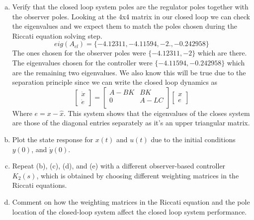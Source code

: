 \documentclass{article}
\begin{document}
\begin{enumerate}[(a)]
\item Verify that the closed loop system poles are the regulator poles together with the observer poles.
\newline
Looking at the 4x4 matrix in our closed loop we can check the eigenvalues and we expect them to match the poles chosen during the Riccati equation solving step.
$$ eig(A_{cl})= \{-4.12311, -4.11594, -2., -0.242958\} $$
The ones chosen for the observer poles were $\{ -4.12311, -2\}$ which are there.
The eigenvalues chosen for the controller were $\{-4.11594,-0.242958\}$ which are the remaining two eigenvalues.
We also know this will be true due to the separation principle since we can write the closed loop dynamics as
$$
\begin{bmatrix} \dot{x} \\ \dot{e} \end{bmatrix} =
\begin{bmatrix}
A - BK & BK \\
0 & A - LC \\
\end{bmatrix}
\begin{bmatrix} x \\ e \end{bmatrix}
$$
Where $e = x -\hat{x}$. This system shows that the eigenvalues of the closes system are those of the diagonal entries separately as it's an upper triangular matrix.

\item Plot the state response for $x(t)$ and $u(t)$ due to the initial conditions $y(0)$, and $\dot{y}(0)$.
\newline


\item Repeat (b), (c), (d), and (e) with a different observer-based controller $K_2(s)$, which is obtained by choosing different weighting matrices in the Riccati equations.
\newline

\item Comment on how the weighting matrices in the Riccati equation and the pole location of the closed-loop system affect the closed loop system performance.
\newline

\end{enumerate}
\end{document}
